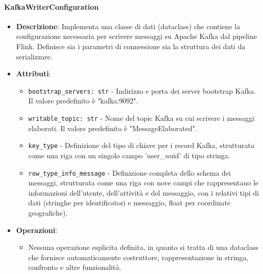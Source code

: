 \documentclass[10pt]{article}
\begin{document}
    \paragraph{KafkaWriterConfiguration}
    \begin{itemize} 
    \item \textbf{Descrizione}: Implementa una classe di dati (dataclass) che contiene la configurazione necessaria per scrivere messaggi su Apache Kafka dal pipeline Flink. Definisce sia i parametri di connessione sia la struttura dei dati da serializzare.
    \item \textbf{Attributi}:
    \begin{itemize}
        \item \texttt{bootstrap\_servers: str} - Indirizzo e porta dei server bootstrap Kafka. Il valore predefinito è "kafka:9092".
        \item \texttt{writable\_topic: str} - Nome del topic Kafka su cui scrivere i messaggi elaborati. Il valore predefinito è "MessageElaborated".
        \item \texttt{key\_type} - Definizione del tipo di chiave per i record Kafka, strutturata come una riga con un singolo campo 'user\_uuid' di tipo stringa.
        \item \texttt{row\_type\_info\_message} - Definizione completa dello schema dei messaggi, strutturata come una riga con nove campi che rappresentano le informazioni dell'utente, dell'attività e del messaggio, con i relativi tipi di dati (stringhe per identificatori e messaggio, float per coordinate geografiche).
    \end{itemize}
    
    \item \textbf{Operazioni}:
    \begin{itemize}
        \item Nessuna operazione esplicita definita, in quanto si tratta di una dataclass che fornisce automaticamente costruttore, rappresentazione in stringa, confronto e altre funzionalità.
    \end{itemize}
    \end{itemize}
\end{document}
